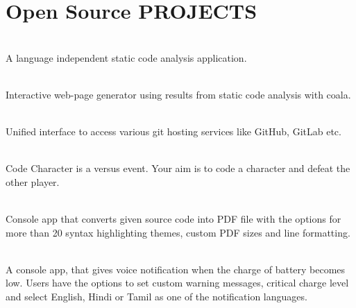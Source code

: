 \documentclass[]{deedy-resume-openfont}
\begin{document}
\begin{minipage}[t]{0.66\textwidth}

\section{Open Source PROJECTS}

\\
A language independent static code analysis application. \textbf{\href{https://github.com/coala/coala}{ }}
\sectionsep

\\
Interactive web-page generator using results from static code analysis with coala.
\textbf{\href{https://github.com/coala/coala-html}{ }}
\sectionsep

\\
Unified interface to access various git hosting services like GitHub, GitLab etc.
\textbf{\href{https://gitlab.com/gitmate/IGitt/}{ }}
\sectionsep

\\
Code Character is a versus event. Your aim is to code a character and defeat the other player.
\textbf{\href{https://github.com/ash7594/code-control}{}}
\sectionsep

\\
Console app that converts given source code into PDF file with the options for more than 20 syntax highlighting themes, custom PDF sizes and line formatting. \textbf{\href{https://github.com/tushar-rishav/code2pdf}{}}
\sectionsep

\\
A console app, that gives voice notification when the charge of battery becomes low. Users have the options to set custom warning messages, critical charge level and select English, Hindi or Tamil as one of the notification languages. \textbf{\href{https://github.com/tushar-rishav/balert}{}}
\sectionsep



\end{minipage} 
\end{document}
